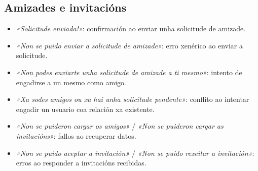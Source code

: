 \subsection*{Amizades e invitacións}
\begin{itemize}
  \item \textit{«Solicitude enviada!»}: confirmación ao enviar unha solicitude de amizade.
  \item \textit{«Non se puido enviar a solicitude de amizade»}: erro xenérico ao enviar a
        solicitude.
  \item \textit{«Non podes enviarte unha solicitude de amizade a ti mesmo»}: intento de
        engadirse a un mesmo como amigo.
  \item \textit{«Xa sodes amigos ou xa hai unha solicitude pendente»}: conflito ao intentar
        engadir un usuario coa relación xa existente.
  \item \textit{«Non se puideron cargar os amigos»} /
        \textit{«Non se puideron cargar as invitacións»}: fallos ao recuperar datos.
  \item \textit{«Non se puido aceptar a invitación»} /
        \textit{«Non se puido rexeitar a invitación»}: erros ao responder a invitacións
        recibidas.
\end{itemize}
